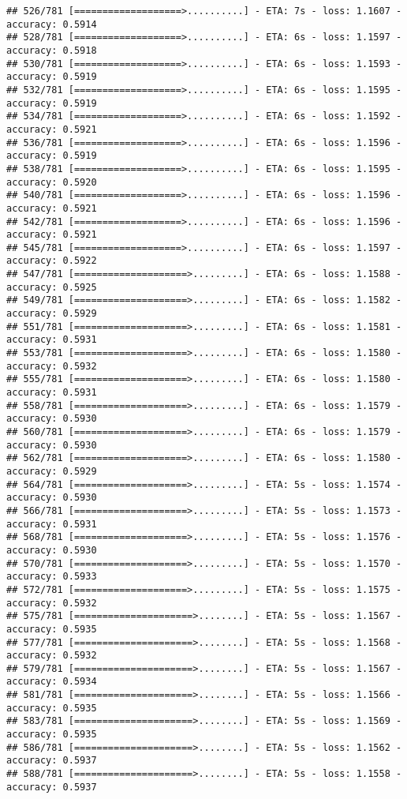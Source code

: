 \documentclass[
]{article}
\begin{document}
\begin{verbatim}
## 526/781 [===================>..........] - ETA: 7s - loss: 1.1607 - accuracy: 0.5914
## 528/781 [===================>..........] - ETA: 6s - loss: 1.1597 - accuracy: 0.5918
## 530/781 [===================>..........] - ETA: 6s - loss: 1.1593 - accuracy: 0.5919
## 532/781 [===================>..........] - ETA: 6s - loss: 1.1595 - accuracy: 0.5919
## 534/781 [===================>..........] - ETA: 6s - loss: 1.1592 - accuracy: 0.5921
## 536/781 [===================>..........] - ETA: 6s - loss: 1.1596 - accuracy: 0.5919
## 538/781 [===================>..........] - ETA: 6s - loss: 1.1595 - accuracy: 0.5920
## 540/781 [===================>..........] - ETA: 6s - loss: 1.1596 - accuracy: 0.5921
## 542/781 [===================>..........] - ETA: 6s - loss: 1.1596 - accuracy: 0.5921
## 545/781 [===================>..........] - ETA: 6s - loss: 1.1597 - accuracy: 0.5922
## 547/781 [====================>.........] - ETA: 6s - loss: 1.1588 - accuracy: 0.5925
## 549/781 [====================>.........] - ETA: 6s - loss: 1.1582 - accuracy: 0.5929
## 551/781 [====================>.........] - ETA: 6s - loss: 1.1581 - accuracy: 0.5931
## 553/781 [====================>.........] - ETA: 6s - loss: 1.1580 - accuracy: 0.5932
## 555/781 [====================>.........] - ETA: 6s - loss: 1.1580 - accuracy: 0.5931
## 558/781 [====================>.........] - ETA: 6s - loss: 1.1579 - accuracy: 0.5930
## 560/781 [====================>.........] - ETA: 6s - loss: 1.1579 - accuracy: 0.5930
## 562/781 [====================>.........] - ETA: 6s - loss: 1.1580 - accuracy: 0.5929
## 564/781 [====================>.........] - ETA: 5s - loss: 1.1574 - accuracy: 0.5930
## 566/781 [====================>.........] - ETA: 5s - loss: 1.1573 - accuracy: 0.5931
## 568/781 [====================>.........] - ETA: 5s - loss: 1.1576 - accuracy: 0.5930
## 570/781 [====================>.........] - ETA: 5s - loss: 1.1570 - accuracy: 0.5933
## 572/781 [====================>.........] - ETA: 5s - loss: 1.1575 - accuracy: 0.5932
## 575/781 [=====================>........] - ETA: 5s - loss: 1.1567 - accuracy: 0.5935
## 577/781 [=====================>........] - ETA: 5s - loss: 1.1568 - accuracy: 0.5932
## 579/781 [=====================>........] - ETA: 5s - loss: 1.1567 - accuracy: 0.5934
## 581/781 [=====================>........] - ETA: 5s - loss: 1.1566 - accuracy: 0.5935
## 583/781 [=====================>........] - ETA: 5s - loss: 1.1569 - accuracy: 0.5935
## 586/781 [=====================>........] - ETA: 5s - loss: 1.1562 - accuracy: 0.5937
## 588/781 [=====================>........] - ETA: 5s - loss: 1.1558 - accuracy: 0.5937

\end{verbatim}
\end{document}
